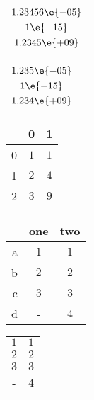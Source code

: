 \begin{table}[htp]
  \begin{center}
    \begin{tabular}{c}
      \toprule
      $1.23456\e{-05}$\\
      $1\e{-15}$\\
      $1.2345\e{+09}$\\
      \bottomrule
    \end{tabular}
  \end{center}
  \end{table}
\begin{table}[htp]
  \begin{center}
    \begin{tabular}{c}
      \toprule
      $1.235\e{-05}$\\
      $1\e{-15}$\\
      $1.234\e{+09}$\\
      \bottomrule
    \end{tabular}
  \end{center}
\end{table}
\begin{table}[htp]
	\begin{center}
		\begin{tabular}{rcc}
		\toprule
                {} & {0} & {1}\\
                \midrule
                {0} & $1$ & $1$\\
                {1} & $2$ & $4$\\
                {2} & $3$ & $9$\\
		\bottomrule
		\end{tabular}
	\end{center}
\end{table}
\begin{table}[htp]
	\begin{center}
		\begin{tabular}{rcc}
		\toprule
			{} & {one} & {two}\\
			\midrule
			{a} & $1$ & $1$\\
			{b} & $2$ & $2$\\
			{c} & $3$ & $3$\\
			{d} & {-} & $4$\\
		\bottomrule
		\end{tabular}
	\end{center}
\end{table}
\begin{table}[htp]
	\begin{center}
		\begin{tabular}{cc}
		\toprule
                $1$ & $1$\\
		$2$ & $2$\\
		$3$ & $3$\\
		{-} & $4$\\
		\bottomrule
		\end{tabular}
	\end{center}
\end{table}
